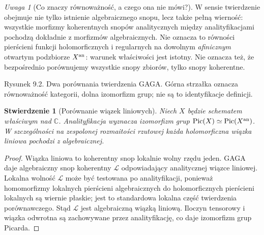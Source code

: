 \documentclass[11pt,a4paper,openany]{report}
\numberwithin{equation}{section}
\theoremstyle{plain}
\newtheorem{stwierdzenie}[twierdzenie]{Stwierdzenie}
\theoremstyle{definition}
\theoremstyle{remark}
\newtheorem{uwaga}[twierdzenie]{Uwaga}
\newcommand{\C}{\mathbb C}
\begin{document}
\begin{uwaga}[Co znaczy równoważność, a czego ona nie mówi?]
W sensie  twierdzenie obejmuje nie tylko istnienie algebraicznego
snopu, lecz także pełną wierność: wszystkie morfizmy
koherentnych snopów analitycznych między analityfikacjami
pochodzą dokładnie z morfizmów algebraicznych.
Nie oznacza to równości pierścieni funkcji holomorficznych
i regularnych na dowolnym \emph{afinicznym} otwartym
podzbiorze $X^{\rm an}$: warunek właściwości jest
istotny. Nie oznacza też, że bezpośrednio porównujemy
wszystkie snopy zbiorów, tylko snopy koherentne.
\end{uwaga}

\begin{center}

{\small Rysunek 9.2. Dwa porównania twierdzenia GAGA.
Górna strzałka oznacza równoważność kategorii, dolna
izomorfizm grup; nie są to identyfikacje definicji.}\par
\end{center}

\begin{stwierdzenie}[Porównanie wiązek liniowych]
Niech $X$ będzie schematem właściwym nad $\C$.
Analityfikacja wyznacza izomorfizm grup
$\operatorname{Pic}(X)\simeq\operatorname{Pic}(X^{\rm an})$.
W szczególności na zespolonej rozmaitości rzutowej
każda holomorficzna wiązka liniowa pochodzi z algebraicznej.
\end{stwierdzenie}
\begin{proof}
Wiązka liniowa to koherentny snop lokalnie wolny rzędu jeden.
GAGA daje algebraiczny snop koherentny $\mathcal L$ odpowiadający
analitycznej wiązce liniowej. Lokalna wolność $\mathcal L$
może być testowana po analityfikacji, ponieważ homomorfizmy
lokalnych pierścieni algebraicznych do holomorficznych
pierścieni lokalnych są wiernie płaskie; jest to standardowa
lokalna część twierdzenia porównawczego. Stąd $\mathcal L$
jest algebraiczną wiązką liniową. Iloczyn tensorowy
i wiązka odwrotna są zachowywane przez analityfikację,
co daje izomorfizm grup Picarda.
\end{proof}
\end{document}
